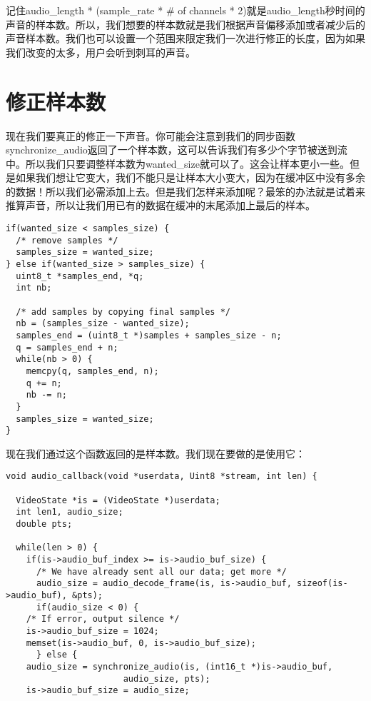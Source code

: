 记住audio_length * (sample_rate * \# of channels * 2)就是audio_length秒时间的声音的样本数。所以，我们想要的样本数就是我们根据声音偏移添加或者减少后的声音样本数。我们也可以设置一个范围来限定我们一次进行修正的长度，因为如果我们改变的太多，用户会听到刺耳的声音。

\section{修正样本数}

现在我们要真正的修正一下声音。你可能会注意到我们的同步函数synchronize_audio返回了一个样本数，这可以告诉我们有多少个字节被送到流中。所以我们只要调整样本数为wanted_size就可以了。这会让样本更小一些。但是如果我们想让它变大，我们不能只是让样本大小变大，因为在缓冲区中没有多余的数据！所以我们必需添加上去。但是我们怎样来添加呢？最笨的办法就是试着来推算声音，所以让我们用已有的数据在缓冲的末尾添加上最后的样本。

\begin{lstlisting}
if(wanted_size < samples_size) {
  /* remove samples */
  samples_size = wanted_size;
} else if(wanted_size > samples_size) {
  uint8_t *samples_end, *q;
  int nb;

  /* add samples by copying final samples */
  nb = (samples_size - wanted_size);
  samples_end = (uint8_t *)samples + samples_size - n;
  q = samples_end + n;
  while(nb > 0) {
    memcpy(q, samples_end, n);
    q += n;
    nb -= n;
  }
  samples_size = wanted_size;
}
\end{lstlisting}

现在我们通过这个函数返回的是样本数。我们现在要做的是使用它：

\begin{lstlisting}
void audio_callback(void *userdata, Uint8 *stream, int len) {

  VideoState *is = (VideoState *)userdata;
  int len1, audio_size;
  double pts;

  while(len > 0) {
    if(is->audio_buf_index >= is->audio_buf_size) {
      /* We have already sent all our data; get more */
      audio_size = audio_decode_frame(is, is->audio_buf, sizeof(is->audio_buf), &pts);
      if(audio_size < 0) {
    /* If error, output silence */
    is->audio_buf_size = 1024;
    memset(is->audio_buf, 0, is->audio_buf_size);
      } else {
    audio_size = synchronize_audio(is, (int16_t *)is->audio_buf,
                       audio_size, pts);
    is->audio_buf_size = audio_size;
\end{lstlisting}

